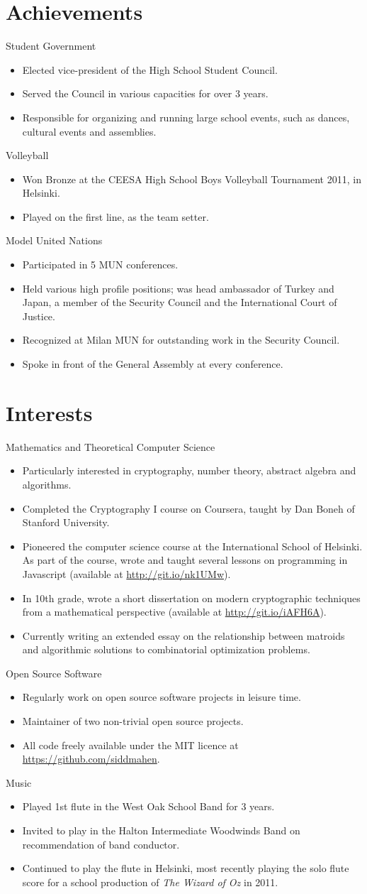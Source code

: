 \documentclass[a4paper,11pt]{article}
\newcommand{\hdr}[2]{{\raggedright\Large #1 \hfill #2}}
\newcommand{\itm}{\item[--]}
\begin{document}
\section{Achievements}
\hdr{Student Government}{}
\begin{itemize}
    \itm Elected vice-president of the High School Student Council.
    \itm Served the Council in various capacities for over 3 years.
    \itm Responsible for organizing and running large school events,
    such as dances, cultural events and assemblies.
\end{itemize}
\bigskip
\hdr{Volleyball}{}
\begin{itemize}
    \itm Won Bronze at the CEESA High School Boys Volleyball
    Tournament 2011, in Helsinki.
    \itm Played on the first line, as the team setter.
\end{itemize}
\bigskip
\hdr{Model United Nations}{}
\begin{itemize}
    \itm Participated in 5 MUN conferences.
    \itm Held various high profile positions; was head ambassador of
    Turkey and Japan, a member of the Security Council and the
    International Court of Justice.
    \itm Recognized at Milan MUN for outstanding work in the Security
    Council.
    \itm Spoke in front of the General Assembly at every conference.
\end{itemize}
\section{Interests}
\hdr{Mathematics and Theoretical Computer Science}{}
\begin{itemize}
    \itm Particularly interested in cryptography, number theory,
    abstract algebra and algorithms.
    \itm Completed the Cryptography I course on Coursera, taught by Dan
    Boneh of Stanford University.
    \itm Pioneered the computer science course at the International School
    of Helsinki. As part of the course, wrote and taught several lessons
    on programming in Javascript (available at \url{http://git.io/nk1UMw}).
    \itm In 10th grade, wrote a short dissertation on modern cryptographic
    techniques from a mathematical perspective (available at
    \url{http://git.io/iAFH6A}).
    \itm Currently writing an extended essay on the relationship between
    matroids and algorithmic solutions to combinatorial optimization
    problems.
\end{itemize}
\bigskip
\hdr{Open Source Software}{}
\begin{itemize}
    \itm Regularly work on open source software projects in leisure
    time.
    \itm Maintainer of two non-trivial open source projects.
    \itm All code freely available under the MIT licence at
    \url{https://github.com/siddmahen}.
\end{itemize}
\bigskip
\hdr{Music}{}
\begin{itemize}
    \itm Played 1st flute in the West Oak School Band for 3 years.
    \itm Invited to play in the Halton Intermediate Woodwinds Band on
    recommendation of band conductor.
    \itm Continued to play the flute in Helsinki, most recently playing the
    solo flute score for a school production of {\it The Wizard of Oz} in
    2011.
\end{itemize}
\end{document}

